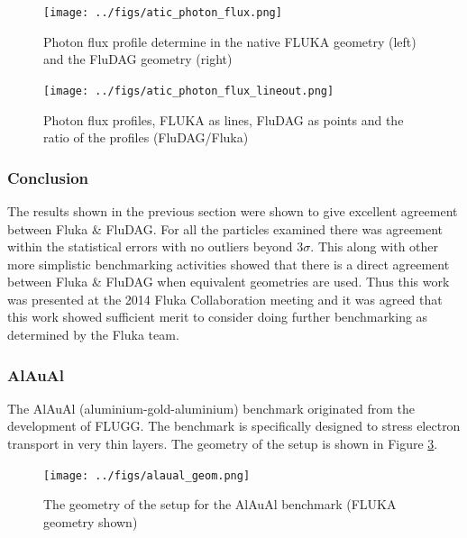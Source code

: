 \begin{figure}[ht!]
 \begin{centering}
 \centering
 \texttt{[image: ../figs/atic\_photon\_flux.png]}
 \caption{Photon flux profile determine in the native FLUKA geometry (left)
          and the FluDAG geometry (right)}
 \label{fig:atic_photon_flux}
 \end{centering}
\end{figure}
\begin{figure}[ht!]
 \begin{centering}
 \centering
 \texttt{[image: ../figs/atic\_photon\_flux\_lineout.png]}
 \caption{Photon flux profiles, FLUKA as lines, FluDAG as points and the ratio
          of the profiles (FluDAG/Fluka)}
 \label{fig:atic_photon_flux_lineout}
 \end{centering}
\end{figure}

\clearpage
\subsubsection{Conclusion}
The results shown in the previous section were shown to give excellent agreement
between Fluka \& FluDAG. For all the particles examined there was agreement
within the statistical errors with no outliers beyond 3$\sigma$. This along with
other more simplistic benchmarking activities showed that there is a direct
agreement between Fluka \& FluDAG when equivalent geometries are used. Thus
this work was presented at the 2014 Fluka Collaboration meeting and it was
agreed that this work showed sufficient merit to consider doing further
benchmarking as determined by the Fluka team.

\clearpage
\subsubsection{AlAuAl}
The AlAuAl (aluminium-gold-aluminium) benchmark originated from the development
of FLUGG. The benchmark is specifically designed to stress electron transport in
very thin layers. The geometry of the setup is shown in Figure
\ref{fig:alaual_fig}.

\begin{figure}[ht!]
 \begin{centering}
 \centering
 \texttt{[image: ../figs/alaual\_geom.png]}
 \caption{The geometry of the setup for the AlAuAl benchmark (FLUKA geometry
         shown)}
 \label{fig:alaual_fig}
 \end{centering}
\end{figure}

